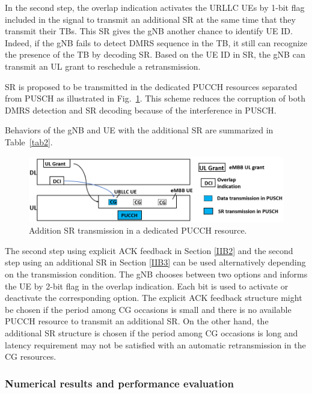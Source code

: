 \documentclass{ieeeaccess}
\begin{document}
In the second step, the overlap indication activates the URLLC UEs by 1-bit flag included in the signal to transmit an additional SR at the same time that they transmit their TBs. This SR gives the gNB another chance to identify UE ID. Indeed, if the gNB fails to detect DMRS sequence in the TB, it still can recognize the presence of the TB by decoding SR. Based on the UE ID in SR, the gNB can transmit an UL grant to reschedule a retransmission.

SR is proposed to be transmitted in the dedicated PUCCH resources separated from PUSCH as illustrated in Fig.~\ref{fig3}. This scheme reduces the corruption of both DMRS detection and SR decoding because of the interference in PUSCH.

Behaviors of the gNB and UE with the additional SR are summarized in Table~\ref{tab2}.

\begin{figure}[htbp]
\centerline{\includegraphics[scale=0.33]{fig3.PNG}}
\caption{Addition SR transmission in a dedicated PUCCH resource.}
\label{fig3}
\vspace{-2mm}
\end{figure}


The second step using explicit ACK feedback in Section \ref{IIB2} and the second step using an additional SR in Section \ref{IIB3} can be used alternatively depending on the transmission condition. The gNB chooses between two options and informs the UE by 2-bit flag in the overlap indication. Each bit is used to activate or deactivate the corresponding option. The explicit ACK feedback structure might be chosen if the period among CG occasions is small and there is no available PUCCH resource to transmit an additional SR. On the other hand, the additional SR structure is chosen if the period among CG occasions is long and latency requirement may not be satisfied with an automatic retransmission in the CG resources. 

\subsubsection{Numerical results and performance evaluation}
\end{document}
